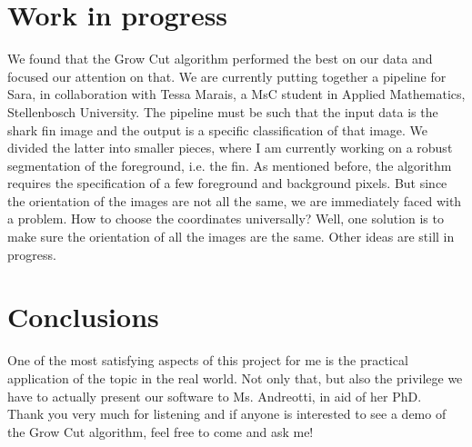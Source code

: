 \documentclass[a4paper,10pt]{article}
\begin{document}
\section{Work in progress}
We found that the Grow Cut algorithm performed the best on our data and focused
our attention on that.  We are currently putting together a pipeline for Sara,
in collaboration with Tessa Marais, a MsC student in Applied Mathematics,
Stellenbosch University. The pipeline must be such that the input data is the
shark fin image and the output is a specific classification of that image. We divided the
latter into smaller pieces, where I am currently working on a robust
segmentation of the foreground, i.e. the fin.  As mentioned before, the
algorithm requires the specification of a few foreground and background pixels. 
But since the orientation of the images are not all the same, we are immediately
faced with a problem. How to choose the coordinates universally?  Well, one
solution is to make sure the orientation of all the images are the same.
Other ideas are still in progress.


\section{Conclusions}
One of the most satisfying aspects of this project for me is the practical
application of the topic in the real world.  Not only that, but also the
privilege we have to actually present our software to Ms. Andreotti, in aid of
her PhD.   \\

Thank you very much for listening and if anyone is interested to see a demo of
the Grow Cut algorithm, feel free to come and ask me!
\end{document}
